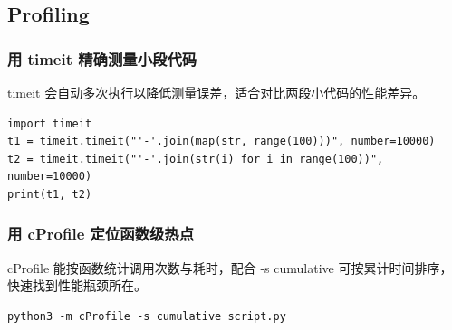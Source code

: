 \subsection{Profiling}

\subsubsection{用 timeit 精确测量小段代码}
timeit 会自动多次执行以降低测量误差，适合对比两段小代码的性能差异。
\begin{verbatim}
import timeit
t1 = timeit.timeit("'-'.join(map(str, range(100)))", number=10000)
t2 = timeit.timeit("'-'.join(str(i) for i in range(100))", number=10000)
print(t1, t2)
\end{verbatim}

\subsubsection{用 cProfile 定位函数级热点}
cProfile 能按函数统计调用次数与耗时，配合 -s cumulative 可按累计时间排序，快速找到性能瓶颈所在。
\begin{verbatim}
python3 -m cProfile -s cumulative script.py
\end{verbatim}